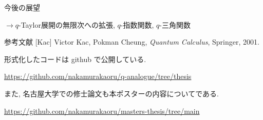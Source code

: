 \documentclass[unicode,mathserif]{beamer}
\begin{document}
\begin{frame}[fragile]
\begin{columns}[T]
\begin{column}{0.33\columnwidth}
\begin{block}{今後の展望}
\begin{itemize}
				$\to$$q$-Taylor展開の無限次への拡張, $q$-指数関数, $q$-三角関数
			\end{itemize}
		\end{block}
		
		\begin{block}{参考文献}
			[Kac] Victor Kac, Pokman Cheung, {\it{Quantum Calculus}}, Springer, 2001.
		\end{block}

		形式化したコードは github で公開している. 
		
		\url{https://github.com/nakamurakaoru/q-analogue/tree/thesis}
		
		また, 名古屋大学での修士論文も本ポスターの内容についてである. 
		
		\url{https://github.com/nakamurakaoru/masters-thesis/tree/main}
		
	\end{column}
	\end{columns}
\end{frame}
\end{document}
